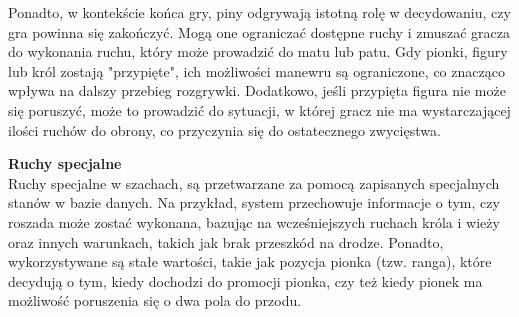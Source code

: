 \documentclass[12pt,a4paper]{article}
\begin{document}
\noindent
Ponadto, w kontekście końca gry, piny odgrywają istotną rolę w decydowaniu, czy gra powinna się zakończyć. Mogą one ograniczać dostępne ruchy i zmuszać gracza do wykonania ruchu, który może prowadzić do matu lub patu. Gdy pionki, figury lub król zostają "przypięte", ich możliwości manewru są ograniczone, co znacząco wpływa na dalszy przebieg rozgrywki. Dodatkowo, jeśli przypięta figura nie może się poruszyć, może to prowadzić do sytuacji, w której gracz nie ma wystarczającej ilości ruchów do obrony, co przyczynia się do ostatecznego zwycięstwa.

\newpage

\noindent \textbf{Ruchy specjalne}\\
Ruchy specjalne w szachach, są przetwarzane za pomocą zapisanych specjalnych stanów w bazie danych. Na przykład, system przechowuje informacje o tym, czy roszada może zostać wykonana, bazując na wcześniejszych ruchach króla i wieży oraz innych warunkach, takich jak brak przeszkód na drodze. Ponadto, wykorzystywane są stałe wartości, takie jak pozycja pionka (tzw. ranga), które decydują o tym, kiedy dochodzi do promocji pionka, czy też kiedy pionek ma możliwość poruszenia się o dwa pola do przodu.
\end{document}
